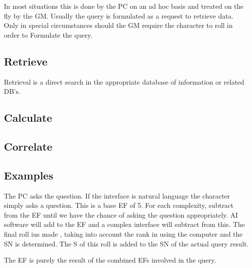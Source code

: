 In most situations this is done by the PC on an ad hoc basis and
treated on the fly by the GM. Usually the query is formulated as a
request to retrieve data. Only in special circumstances should the GM
require the character to roll in order to Formulate the query.


\subsection{Retrieve}

Retrieval is a direct search in the appropriate database of
information or related DB's.

\subsection{Calculate}
\subsection{Correlate}

\subsection{Examples}

The PC asks the question. If the interface is natural language the
character simply asks a question. This is a base EF of 5. For each
complexity, subtract from the EF until we have the chance of asking the
question appropriately. AI software will add to the EF and a complex
interface will subtract from this. The final roll ius made , taking into
account the rank in using the computer and the SN is determined. The S
of this roll is added to the SN of the actual query result.

The EF is purely the result of the combined EFs involved in the query.

